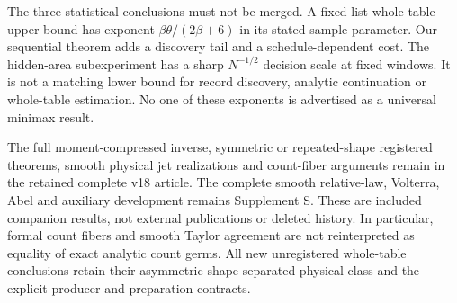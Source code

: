 The three statistical conclusions must not be merged. A fixed-list
whole-table upper bound has exponent $\beta\theta/(2\beta+6)$ in its
stated sample parameter. Our sequential theorem adds a discovery tail and
a schedule-dependent cost. The hidden-area subexperiment has a sharp
$N^{-1/2}$ decision scale at fixed windows. It is not a matching lower
bound for record discovery, analytic continuation or whole-table estimation.
No one of these exponents is advertised as a universal minimax result.

The full moment-compressed inverse, symmetric or repeated-shape registered
theorems, smooth physical jet realizations and count-fiber arguments remain
in the retained complete v18 article. The complete smooth relative-law,
Volterra, Abel and auxiliary development remains Supplement S. These are
included companion results, not external publications or deleted history.
In particular, formal count fibers and smooth Taylor agreement are not
reinterpreted as equality of exact analytic count germs. All new unregistered
whole-table conclusions retain their asymmetric shape-separated physical
class and the explicit producer and preparation contracts.
